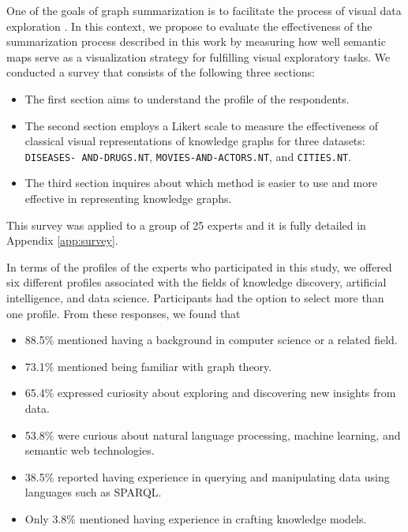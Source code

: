 \documentclass{ieeeaccess}
\begin{document}
One of the goals of graph summarization is to 
facilitate the process of visual data exploration
\cite{liu2018graph}. In this context, we propose 
to evaluate the effectiveness of the summarization
process described in this work by measuring how 
well semantic maps serve as a visualization 
strategy for fulfilling visual exploratory tasks.
We conducted a survey that consists of the following
three sections:

\begin{itemize}
    \item The first section aims to understand 
    the profile of the respondents.
    \item The second section employs a Likert 
    scale \cite{Likert1932} to measure the
    effectiveness of classical visual 
    representations of knowledge 
    graphs for three datasets: \texttt{DISEASES-
    AND-DRUGS.NT}, \texttt{MOVIES-AND-ACTORS.NT}, 
    and \texttt{CITIES.NT}.
    \item The third section inquires about which 
    method is easier to use and more effective in 
    representing knowledge graphs.
\end{itemize}

This survey was applied to a group of 25 experts and it is
fully detailed in Appendix \ref{app:survey}.

In terms of the profiles of the experts who 
participated in this study, we offered six 
different profiles associated with the fields of
knowledge discovery, artificial intelligence, and 
data science. Participants had the option to 
select more than one profile. From these 
responses, we found that

\begin{itemize}
    \item 88.5\% mentioned having a background in computer science or a related field.
    \item 73.1\% mentioned being familiar with graph theory.
    \item 65.4\% expressed curiosity about exploring and discovering new insights from data.
    \item 53.8\% were curious about natural language processing, machine learning, and semantic web technologies.
    \item 38.5\% reported having experience in querying and manipulating data using languages such as SPARQL.
    \item Only 3.8\% mentioned having experience in crafting knowledge models.
\end{itemize}
\end{document}
